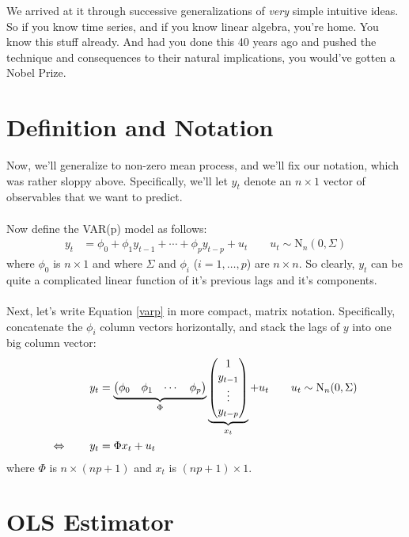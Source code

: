 \documentclass[a4paper,12pt]{scrartcl}
\begin{document}
We arrived at it through successive generalizations
of \emph{very} simple intuitive ideas. So if you know
time series, and if you know linear algebra, you're home.
You know this stuff already. And had you done this 40 years
ago and pushed the technique and consequences
to their natural implications, you would've gotten a Nobel 
Prize. 


\newpage
\section{Definition and Notation}

Now, we'll generalize to non-zero mean process, and 
we'll fix our notation, which was rather
sloppy above.  Specifically, we'll let $y_t$ denote
an $n\times 1$ vector of observables that we
want to predict.  
\\
\\
Now define the VAR(p) model as follows:
\begin{align}
    \label{varp}
    y_t &= \phi_0 + \phi_1 y_{t-1} + \cdots + 
	\phi_p y_{t-p} + u_{t} 
	\qquad u_t \sim \text{N}_n(0, \Sigma)
\end{align}
where $\phi_0$ is $n\times 1$ and where $\Sigma$ and
$\phi_i$ ($i = 1, \ldots, p$) are $n\times n$.
So clearly, $y_t$ can be quite a complicated linear
function of it's previous lags and it's components.
\\
\\
Next, let's write Equation \ref{varp} in more
compact, matrix notation.  Specifically, concatenate
the $\phi_i$ column vectors horizontally, and stack the lags 
of $y$ into one big column vector:
\begin{align} 
    y_t &= \underbrace{\begin{pmatrix} \phi_0 & \phi_1 & \cdots 
	& \phi_p \end{pmatrix}}_{\Phi}
	\underbrace{\begin{pmatrix} 
	    1 \\ y_{t-1} \\ \vdots \\ y_{t-p}
	\end{pmatrix}}_{x_t} + u_t \qquad u_t \sim \text{N}_n(0, \Sigma) 
	 \notag \\
    \Leftrightarrow \qquad y_t &= \Phi x_t + u_t 
    \label{varvec}
\end{align} 
where $\Phi$ is $n\times (np +1)$ and $x_t$ is 
$(np+1) \times 1$.


\section{OLS Estimator}
\end{document}
